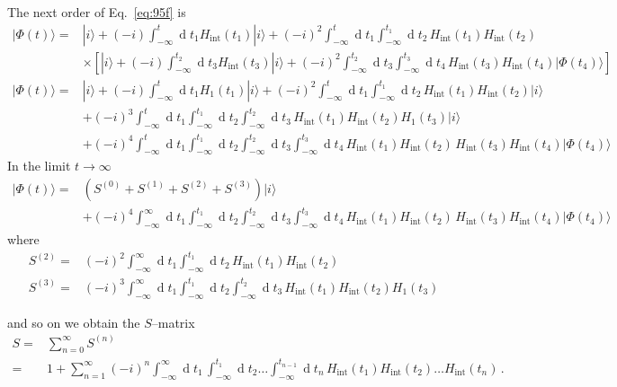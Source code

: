 \begin{frame}
The next order of Eq.~\eqref{eq:95f} is
\begin{align}
  |\Phi(t)\rangle=&|i\rangle+(-i)\int_{-\infty}^t \operatorname{d}t_1 H_{\text{int}}(t_1)|i\rangle+(-i)^2\int_{-\infty}^t \operatorname{d}t_1\int_{-\infty}^{t_1} \operatorname{d}t_2\,H_{\text{int}}(t_1)H_{\text{int}}(t_2)\nonumber\\
  &\times\left[|i\rangle+(-i)\int_{-\infty}^{t_2} \operatorname{d}t_3 H_{\text{int}}(t_3)|i\rangle+(-i)^2\int_{-\infty}^{t_2} \operatorname{d}t_3\int_{-\infty}^{t_3} \operatorname{d}t_4\,H_{\text{int}}(t_3)H_{\text{int}}(t_4)|\Phi(t_4)\rangle\right]
\end{align}
\begin{align}
  |\Phi(t)\rangle=&|i\rangle+(-i)\int_{-\infty}^t \operatorname{d}t_1 H_1(t_1)|i\rangle+(-i)^2\int_{-\infty}^t \operatorname{d}t_1\int_{-\infty}^{t_1} \operatorname{d}t_2\,H_{\text{int}}(t_1)H_{\text{int}}(t_2)|i\rangle\nonumber\\
  &+(-i)^3\int_{-\infty}^t \operatorname{d}t_1\int_{-\infty}^{t_1} \operatorname{d}t_2\int_{-\infty}^{t_2} \operatorname{d}t_3\,H_{\text{int}}(t_1)H_{\text{int}}(t_2) H_1(t_3)|i\rangle\nonumber\\
  &+(-i)^4\int_{-\infty}^t \operatorname{d}t_1\int_{-\infty}^{t_1}\operatorname{d}t_2 \int_{-\infty}^{t_2} \operatorname{d}t_3\int_{-\infty}^{t_3}\operatorname{d}t_4 \,H_{\text{int}}(t_1)H_{\text{int}}(t_2)\,H_{\text{int}}(t_3)H_{\text{int}}(t_4)|\Phi(t_4)\rangle
\end{align}
In the limit $t\to\infty$
\begin{align}
  |\Phi(t)\rangle=&\left(S^{(0)}+S^{(1)}+S^{(2)}+S^{(3)}\right)|i\rangle\nonumber\\
  &+(-i)^4\int_{-\infty}^\infty \operatorname{d}t_1\int_{-\infty}^{t_1}\operatorname{d}t_2 \int_{-\infty}^{t_2} \operatorname{d}t_3\int_{-\infty}^{t_3}\operatorname{d}t_4 \,H_{\text{int}}(t_1)H_{\text{int}}(t_2)\,H_{\text{int}}(t_3)H_{\text{int}}(t_4)|\Phi(t_4)\rangle
\end{align}
where
\begin{align}
  S^{(2)}=&(-i)^2\int_{-\infty}^\infty \operatorname{d}t_1\int_{-\infty}^{t_1} \operatorname{d}t_2\,H_{\text{int}}(t_1)H_{\text{int}}(t_2)\nonumber\\
  S^{(3)}=&(-i)^3\int_{-\infty}^\infty \operatorname{d}t_1\int_{-\infty}^{t_1} \operatorname{d}t_2\int_{-\infty}^{t_2} \operatorname{d}t_3\,H_{\text{int}}(t_1)H_{\text{int}}(t_2) H_1(t_3)
\end{align}
\end{frame}
\begin{frame}
and so on we obtain the $S$--matrix
\begin{align}
  S=&\sum_{n=0}^\infty S^{(n)}\nonumber\\
  =&1+\sum_{n=1}^\infty(-i)^n\int_{-\infty}^{\infty}\operatorname{d}t_1\,\int_{-\infty}^{t_1} \operatorname{d}t_2\ldots\int_{-\infty}^{t_{n-1}}\operatorname{d}t_n\,{H}_{\text{int}}(t_1){H}_{\text{int}}(t_2)\ldots{H}_{\text{int}}(t_n)\,.
\end{align}
\end{frame}

